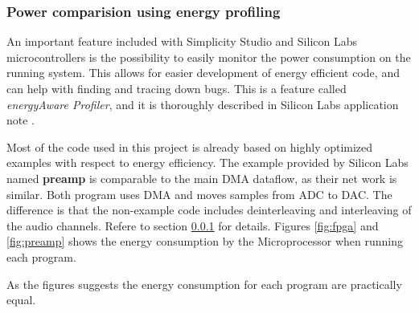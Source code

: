 \subsubsection{Power comparision using energy profiling}

An important feature included with Simplicity Studio and Silicon Labs microcontrollers
is the possibility to easily monitor the power consumption on the running system.
This allows for easier development of energy efficient code, and can help
with finding and tracing down bugs. 
This is a feature called \textit{energyAware Profiler}, and it is thoroughly 
described in Silicon Labs application note \cite{energydbg}.

Most of the code used in this project is already based on highly optimized 
examples with respect to energy efficiency.
The example provided by Silicon Labs named {\bf preamp} is comparable to the main
DMA dataflow, as their net work is similar. Both program uses DMA and moves samples 
from ADC to DAC. The difference is that the non-example code includes deinterleaving
and interleaving of the audio channels. Refere to section \ref{} for details. Figures \ref{fig:fpga} and \ref{fig:preamp}
shows the energy consumption by the Microprocessor when running each program.





As the figures suggests the energy consumption for each program are practically equal.
